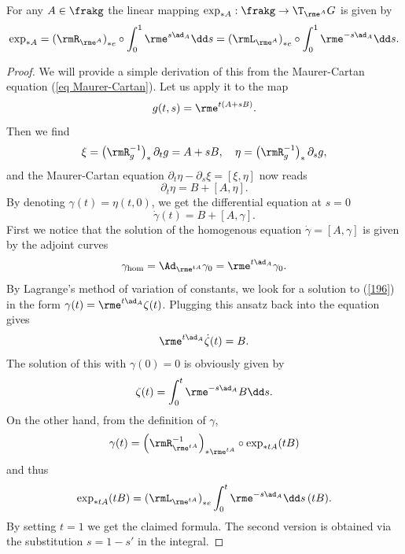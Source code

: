 \begin{thm}[{{\cite[Thm.~1.5.3]{DK}}}]\label{thm differential of exp}
    For any $A\in\frakg$ the linear mapping $\exp_{\ast A}:\frakg\to \T_{\rme^A} G$ is given by
    \[  \exp_{\ast A}=\left(\rmR_{\rme^A}\right)_{\ast e}\circ \int_0^1 \rme^{s\ad_A}\dd s=\left(\rmL_{\rme^A}\right)_{\ast e}\circ \int_0^1 \rme^{-s\ad_A}\dd s.   \label{eq 1.5.1 DK}\]
\end{thm}
\begin{proof}
    We will provide a simple derivation of this from the Maurer-Cartan equation (\ref{eq Maurer-Cartan}). Let us apply it to the map
    \[g(t,s)=\rme^{t(A+sB)}.\]
    Then we find
    \[\xi=\left(\rmR_g^{-1}\right)_\ast \partial_t g=A+sB, \quad \eta=\left(\rmR_g^{-1}\right)_\ast \partial_s g,\]
    and the Maurer-Cartan equation $\partial_t\eta-\partial_s\xi=[\xi,\eta]$ now reads
    \[\partial_t \eta=B+[A,\eta].\]
    By denoting $\gamma(t)=\eta(t,0)$, we get the differential equation at $s=0$
    \[\dot\gamma(t)=B+[A,\gamma].\label{196}\]
    First we notice that the solution of the homogenous equation $\dot\gamma=[A,\gamma]$ is given by the adjoint curves
    \[\gamma_{\mathrm{hom}}=\Ad_{\rme^{tA}}\gamma_0=\rme^{t\ad_A}\gamma_0.\]
    By Lagrange's method of variation of constants, we look for a solution to (\ref{196}) in the form $\gamma(t)=\rme^{t\ad_A}\zeta(t)$. Plugging this ansatz back into the equation gives
    \[\rme^{t\ad_A}\dot\zeta(t)=B.\]
    The solution of this with $\gamma(0)=0$ is obviously given by
    \[\zeta(t)=\int_0^t \rme^{-s\ad_A}B\dd s.\]
    On the other hand, from the definition of $\gamma$,
    \[\gamma(t)=\left(\rmR_{\rme^{tA}}^{-1}\right)_{\ast \rme^{tA}}\circ \exp_{\ast tA}(tB)\]
    and thus
    \[\exp_{\ast tA}(tB)=\left(\rmL_{\rme^{tA}}\right)_{\ast e}\int_0^t\rme^{-s\ad_A}\dd s\,(tB).\]
    By setting $t=1$ we get the claimed formula. The second version is obtained via the substitution $s=1-s'$ in the integral.
\end{proof}


